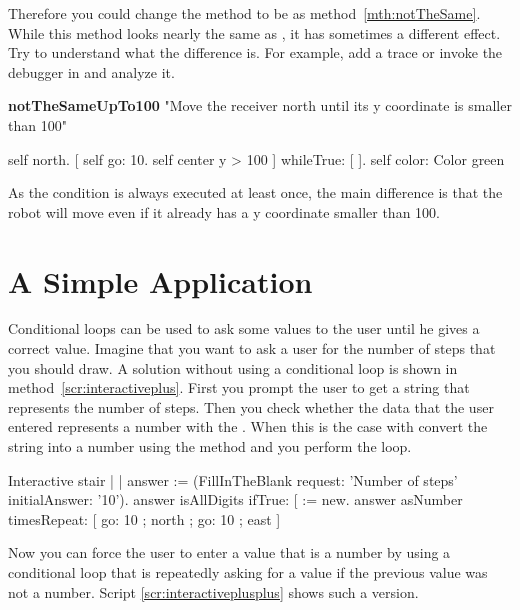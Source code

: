 Therefore you could change the method  to be as method~\ref{mth:notTheSame}. While this method looks nearly the same as , it has sometimes a  different effect. Try to understand what the difference is. For example, add a trace or invoke the debugger in  and analyze it. 

\begin{method}\label{mth:notTheSame}
\textbf{notTheSameUpTo100}
   "Move the receiver north until its y coordinate is smaller than 100"

   self north.
   [ self go: 10.
   self center y > 100 ]
      whileTrue: [ ].
   self color: Color green
\end{method}

As the condition is always executed at least once, the main difference is that the robot will move even if it already has a y coordinate smaller than 100.  




\section{A Simple Application}

Conditional loops can be used to ask some values to the user until he gives a correct value. Imagine that you want to ask a user for the number of steps that you should draw. A solution without using a conditional loop is shown in method~\ref{scr:interactiveplus}. First you prompt the user to get a string that represents the number of steps. Then you check whether the data that the user entered represents a number with the . When this is the case with convert the string into a number using the method  and you perform the loop.


\begin{scriptwithtitle}{Interactive stair}\label{scr:interactiveplus}
| \caro  | 
answer := (FillInTheBlank 
                         request: 'Number of steps' 
                         initialAnswer: '10'). 
answer isAllDigits
   ifTrue: [ \caro := \Turtle new.
           answer asNumber timesRepeat:  
                  [ \caro 
                     go: 10 ; 
                     north ; 
                     go: 10 ;
                     east ]
\end{scriptwithtitle}

Now you can force the user to enter a value that is a number by using a conditional loop that is repeatedly asking for a value if the previous value was not a number.  Script \ref{scr:interactiveplusplus} shows such a version. 

